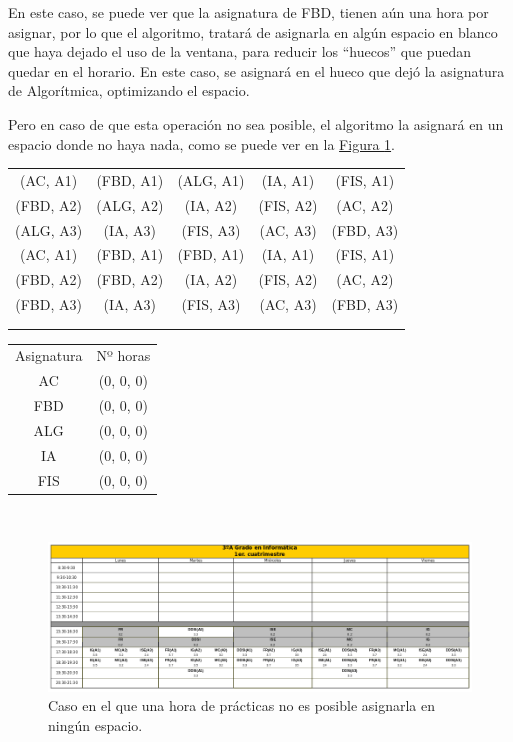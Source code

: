 En este caso, se puede ver que la asignatura de FBD, tienen aún una hora por asignar, por lo que el algoritmo, tratará de asignarla en algún espacio en blanco que haya dejado el uso de la ventana, para reducir los ``huecos'' que puedan quedar en el horario. En este caso, se asignará en el hueco que dejó la asignatura de Algorítmica, optimizando el espacio. 

Pero en caso de que esta operación no sea posible, el algoritmo la asignará en un espacio donde no haya nada, como se puede ver en la \hyperref[horario]{Figura \ref*{horario}}.\\

\begin{minipage}{0.745\textwidth}    
\begin{tabular}{| c | c | c | c | c |}
\hline
 (AC, A1) & (FBD, A1) & (ALG, A1) & (IA, A1) & (FIS, A1) \\
 (FBD, A2) & (ALG, A2) & (IA, A2) & (FIS, A2) & (AC, A2) \\
 (ALG, A3) &  (IA, A3) & (FIS, A3) & (AC, A3) & (FBD, A3) \\
 \hline
 (AC, A1) & (FBD, A1) & (FBD, A1) & (IA, A1) & (FIS, A1) \\
 (FBD, A2) & (FBD, A2) & (IA, A2) & (FIS, A2) & (AC, A2) \\
 (FBD, A3) & (IA, A3) & (FIS, A3) & (AC, A3) & (FBD, A3) \\
 \hline
 &  &  &  & \\
 \hline
 &  &  &  & \\
 \hline 
\end{tabular}
\end{minipage}
\begin{minipage}{1\textwidth}
\begin{tabular}{c | c}
Asignatura & Nº horas \\
AC & (0, 0, 0) \\
FBD & (0, 0, 0) \\
ALG & (0, 0, 0) \\
IA & (0, 0, 0) \\
FIS & (0, 0, 0)
\end{tabular}
\end{minipage}
~\\

\begin{figure}[H]
    \centering
    \includegraphics[width=\textwidth]{img/horario}
    \caption{Caso en el que una hora de prácticas no es posible asignarla en ningún espacio.}
    \label{horario}
\end{figure}

